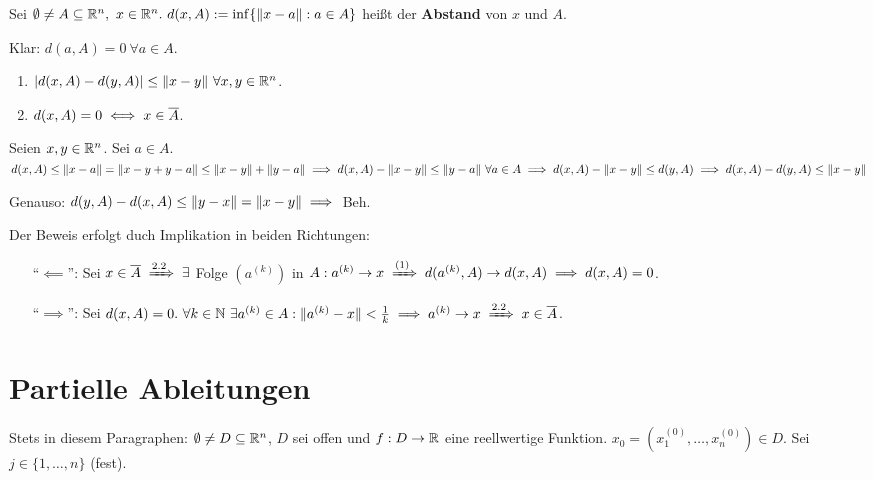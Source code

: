 \documentclass[a4paper,oneside,DIV15,BCOR12mm,chapterprefix=true,headings=onelinechapter]{scrbook}
\begin{document}
\begin{definition*}
Sei $\emptyset \ne A \subseteq \mathbb{R}^n,\ x \in \mathbb{R}^n.\ d(x,A) := \inf\{\|x-a\|:a \in A\}$ heißt der \textbf{Abstand} von $x$ und $A$.

Klar: $d(a,A) = 0\ \forall a \in A$.
\end{definition*}

\begin{satz}
\begin{enumerate}
\item $|d(x,A) - d(y,A)| \le \|x-y\|\ \forall x,y \in \mathbb{R}^n$.
\item $d(x,A) = 0 \iff x \in \overline{A}$.
\end{enumerate}
\end{satz}

\begin{beweise}
\item Seien $x,y \in \mathbb{R}^n$. Sei $a \in A$. $d(x,A) \le \|x-a\| = \|x-y+y-a\| \le \|x-y\|+\|y-a\|\\
\implies d(x,A)-\|x-y\| \le \|y-a\|\ \forall a \in A\\
\implies d(x,A) - \|x-y\| \le d(y,A)\\
\implies d(x,A) - d(y,A) \le \|x-y\|$

Genauso: $d(y,A) - d(x,A) \le \|y-x\| = \|x-y\| \implies$ Beh.
\item Der Beweis erfolgt duch Implikation in beiden Richtungen:
\begin{itemize}
\item["`$\impliedby$"':] Sei $x \in \overline{A} \folgtnach{2.2} \exists$ Folge $(a^{(k)})$ in $A: a^{(k)} \to x \folgtnach{(1)} d(a^{(k)},A) \to d(x,A) \folgt d(x,A) = 0$.
\item["`$\implies$"':] Sei $d(x,A) = 0.\ \forall k \in \MdN\ \exists a^{(k)} \in A: \|a^{(k)} - x\| < \frac{1}{k} \folgt a^{(k)} \to x \folgtnach{2.2} x \in \overline{A}$.
\end{itemize}
\end{beweise}



\chapter{Partielle Ableitungen}

Stets in diesem Paragraphen: $\emptyset\ne D\subseteq \mathbb{R}^n$, $D$ sei offen und $f:D\to\mathbb{R}$ eine reellwertige Funktion. $x_0 = (x_1^{(0)}, \ldots, x_n^{(0)}) \in D$. Sei $j\in\{1,\ldots,n\}$ (fest).
\end{document}
